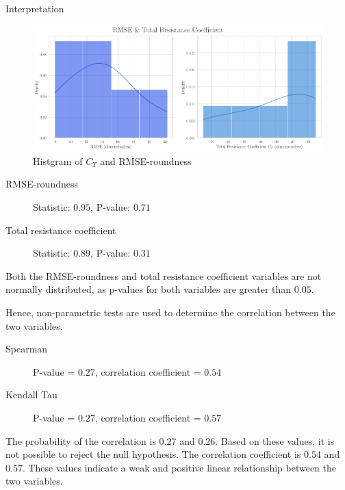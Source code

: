 \documentclass[final, 20pt]{beamer}
\newlength{\colwidth}
\newlength{\twocolwidth}
\begin{document}
\begin{frame}[t]
\begin{columns}[t]
\begin{column}{\twocolwidth}
      \vfill

      \begin{block}{Interpretation}
        \setlength{\columnsep}{2em}
        \begin{multicols}{2}

          \begin{figure}
            \centering
            \includegraphics[width=0.8\linewidth]{images/rmse-vs-ct-histplot}
            \caption{Histgram of $C_T$ and RMSE-roundness}
          \end{figure}

          \begin{description}
            \item[RMSE-roundness] Statistic: $0.95$, P-value: $0.71$
            \item[Total resistance coefficient] Statistic: $0.89$, P-value: $0.31$
          \end{description}

          Both the RMSE-roundness and total resistance coefficient variables are not normally distributed, as p-values for both variables are greater than $0.05$.

          \columnbreak


          Hence, non-parametric tests are used to determine the correlation between the two variables.

          \begin{description}
            \item[Spearman] P-value = $0.27$, correlation coefficient = $0.54$
            \item[Kendall Tau] P-value = $0.27$, correlation coefficient = $0.57$
          \end{description}

          The probability of the correlation is $0.27$ and $0.26$. Based on these values, it is not possible to reject the null hypothesis. The correlation coefficient is $0.54$ and $0.57$. These values indicate a weak and positive linear relationship between the two variables.
        \end{multicols}
      \end{block}
    \end{column}


\end{columns}
\end{frame}
\end{document}
